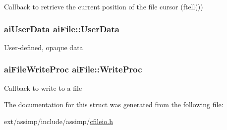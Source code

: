 Callback to retrieve the current position of the file cursor (ftell()) \hypertarget{structai_file_aec528fa18f4755fe4f28d604fde28aad}{
\subsubsection[{User\-Data}]{\setlength{\rightskip}{0pt plus 5cm}ai\-User\-Data ai\-File\-::\-User\-Data}}\label{structai_file_aec528fa18f4755fe4f28d604fde28aad}
User-\/defined, opaque data \hypertarget{structai_file_ab9fca3a62e34a33592c13a6f31db7d1d}{
\subsubsection[{Write\-Proc}]{\setlength{\rightskip}{0pt plus 5cm}ai\-File\-Write\-Proc ai\-File\-::\-Write\-Proc}}\label{structai_file_ab9fca3a62e34a33592c13a6f31db7d1d}
Callback to write to a file 

The documentation for this struct was generated from the following file\-:\begin{DoxyCompactItemize}
\item 
ext/assimp/include/assimp/\hyperlink{cfileio_8h}{cfileio.\-h}\end{DoxyCompactItemize}
